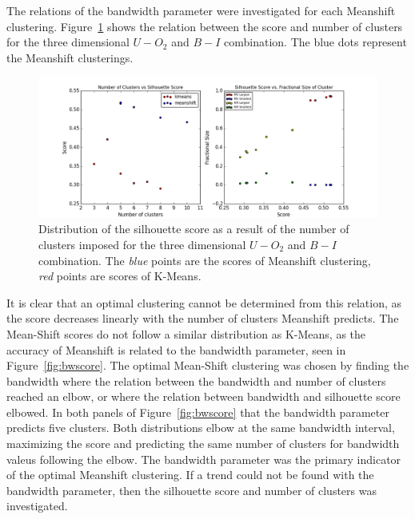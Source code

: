 The relations of the bandwidth parameter were investigated for each Meanshift clustering.
Figure~\ref{fig:bad_ms} shows the relation between the score and number of clusters for the three dimensional $U - O_{2}$ and $B - I$ combination.
The blue dots represent the Meanshift clusterings.

\begin{figure}[H]
\centering
\includegraphics[width=\linewidth]{figs/methods/silhouette_score_bad_ms}
\caption{Distribution of the silhouette score as a result of the number of clusters imposed for the three dimensional $U - O_{2}$ and $B - I$ combination. The \textit{blue} points are the scores of Meanshift clustering, \textit{red} points are scores of K-Means.}
\label{fig:bad_ms}
\end{figure}

It is clear that an optimal clustering cannot be determined from this relation, as the score decreases linearly with the number of clusters Meanshift predicts.
The Mean-Shift scores do not follow a similar distribution as K-Means, as the accuracy of Meanshift is related to the bandwidth parameter, seen in Figure~\ref{fig:bwscore}.
The optimal Mean-Shift clustering was chosen by finding the bandwidth where the relation between the bandwidth and number of clusters reached an elbow, or where the relation between bandwidth and silhouette score elbowed.
In both panels of Figure~\ref{fig:bwscore} that the bandwidth parameter predicts five clusters.
Both distributions elbow at the same bandwidth interval, maximizing the score and predicting the same number of clusters for bandwidth valeus following the elbow.
The bandwidth parameter was the primary indicator of the optimal Meanshift clustering.
If a trend could not be found with the bandwidth parameter, then the silhouette score and number of clusters was investigated.

